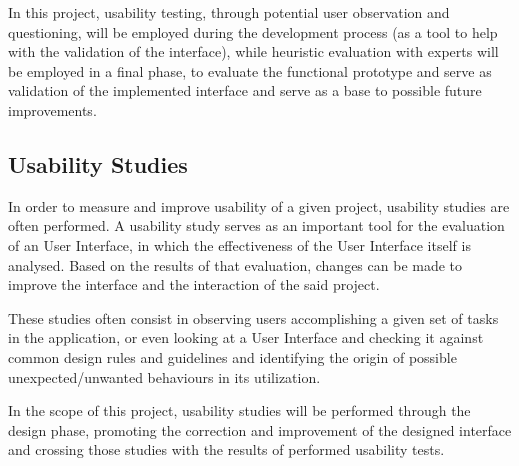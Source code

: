 In this project, usability testing, through potential user observation and questioning, will be employed during the development process (as a tool to help with the validation of the interface), while heuristic evaluation with experts will be employed in a final phase, to evaluate the functional prototype and serve as validation of the implemented interface and serve as a base to possible future improvements.

\subsection{Usability Studies}

In order to measure and improve usability of a given project, usability studies are often performed. A usability study serves as an important tool for the evaluation of an User Interface, in which the effectiveness of the User Interface itself is analysed. Based on the results of that evaluation, changes can be made to improve the interface and the interaction of the said project.

These studies often consist in observing users accomplishing a given set of tasks in the application, or even looking at a User Interface and checking it against common design rules and guidelines \cite{kn:Joh14} and identifying the origin of possible unexpected/unwanted behaviours in its utilization. 

In the scope of this project, usability studies will be performed through the design phase, promoting the correction and improvement of the designed interface and crossing those studies with the results of performed usability tests.








